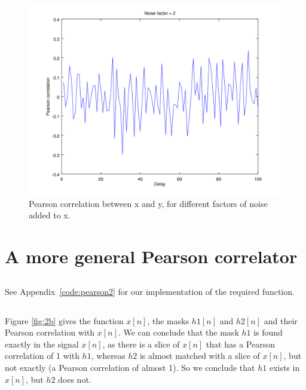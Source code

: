 \documentclass{article}
\begin{document}
\begin{figure}[H]
	\includegraphics[width=.49\textwidth]{plot2noise.png}
	\caption{Pearson correlation between x and y, for different factors of noise added to x.}
	\label{fig:1g2}
\end{figure}

\section{A more general Pearson correlator}
\subsection{}
See Appendix~\ref{code:pearson2} for our implementation of the required function.

\subsection{}
Figure \ref{fig:2b} gives the function $x[n]$, the masks $h1[n]$ and $h2[n]$ and their
Pearson correlation with $x[n]$. We can conclude that the mask $h1$ is found exactly
in the signal $x[n]$, as there is a slice of $x[n]$ that has a Pearson correlation
of 1 with $h1$, whereas $h2$ is almost matched with a slice of $x[n]$, but not exactly
(a Pearson correlation of almost 1). So we conclude that $h1$ exists in $x[n]$, but
$h2$ does not.
\end{document}

